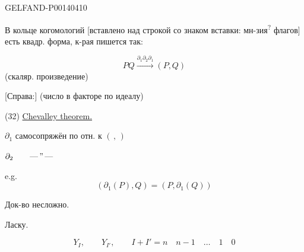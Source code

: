 \begin{GelfandAdjacentEvidence}{GELFAND-P001404}{10}



В кольце когомологий
[вставлено над строкой со знаком вставки: мн-зия\textsuperscript{?} флагов]
есть квадр. форма, к-рая пишется так:

\end{GelfandAdjacentEvidence}



\begin{equation*}
PQ\xrightarrow{\partial_1\partial_2\partial_1}(P,Q) \tag{31}
\end{equation*}
(скаляр. произведение)

[Справа:] (число в факторе по идеалу)

(32) \uline{Chevalley theorem.}

\(\partial_1\) самосопряжён по отн. к \((\, , \,)\)

\(\partial_2\qquad\text{—\,''\,—}\)

e.g.
\begin{equation*}
(\partial_1(P),Q)=(P,\partial_1(Q)) \tag{33}
\end{equation*}

Док-во несложно.

Ласку.

\begin{equation*}
Y_I,\qquad Y_{I'},\qquad I+I'=n\quad n-1\quad\dots\quad1\quad0 \tag{34}
\end{equation*}


